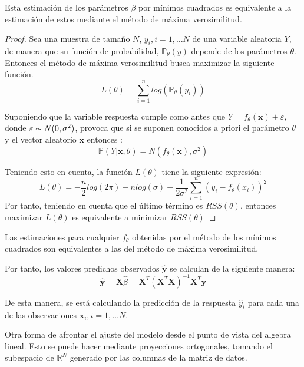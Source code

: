 \begin{propo}
Esta estimación de los parámetros $\beta$ por mínimos cuadrados es equivalente a la estimación de estos mediante el método de máxima verosimilitud.
\begin{proof}
Sea una muestra de tamaño $N$, $y_i, i=1,\ldots N$ de una variable aleatoria $Y$, de manera que su función de probabilidad, $\mathbb{P}_\theta(y)$ depende de los parámetros $\theta$. Entonces el método de máxima verosimilitud busca maximizar la siguiente función.
\begin{equation}
L(\theta)=\sum_{i=1}^n log( \mathbb{P}_{\theta}(y_i))
\end{equation}

\noindent Suponiendo que la variable respuesta cumple como antes que  $Y=f_\theta (\textbf{x})+\varepsilon$, donde $\varepsilon \thicksim N(0,\sigma^2)$, provoca que si se suponen conocidos a priori el parámetro $\theta$ y el vector aleatorio $\textbf{x}$ entonces :
\begin{equation}
\mathbb{P}(Y|\textbf{x},\theta)=N(f_\theta(\textbf{x}), \sigma^2)
\end{equation}

\noindent Teniendo esto en cuenta, la función $L(\theta)$ tiene la siguiente expresión:
\begin{equation}
L(\theta)=-\dfrac{n}{2}log(2\pi)-n log(\sigma)-\dfrac{1}{2\sigma^2}\sum_{i=1}^n (y_i-f_\theta (x_i))^2
\end{equation}
Por tanto, teniendo en cuenta que el último término es $RSS(\theta)$, entonces maximizar $L(\theta)$ es equivalente a minimizar $RSS(\theta)$
\end{proof}
\end{propo}
\begin{coro}
Las estimaciones para cualquier $f_{\theta}$ obtenidas por el método de los mínimos cuadrados son equivalentes a las del método de máxima verosimilitud.  
\end{coro}
\noindent Por tanto, los valores predichos observados $\hat{\textbf{y}}$ se calculan de la siguiente manera:
\begin{equation}
\hat{\textbf{y}}=\textbf{X}\hat{\beta}=\textbf{X}^T(\textbf{X}^T\textbf{X})^{-1}\textbf{X}^T\textbf{y}
\end{equation}

\noindent De esta manera, se está calculando la predicción de la respuesta $\hat{y}_i$ para cada una de las observaciones $\mathbf{x}_i, i =1, \ldots N$. 

\noindent Otra forma de afrontar el ajuste del modelo desde el punto de vista del algebra lineal. Esto se puede hacer mediante proyecciones ortogonales, tomando el subespacio de $\mathbb{R}^N$ generado por las columnas de la matriz de datos.

